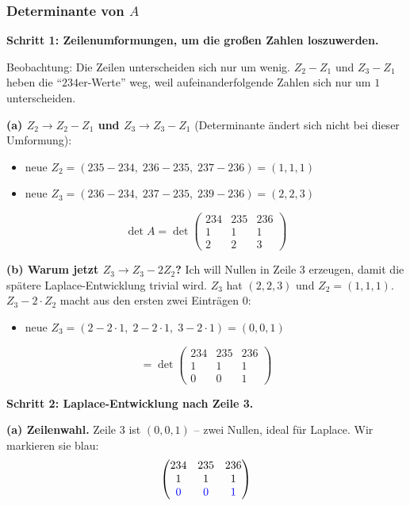 \documentclass[a4paper,12pt]{article}
\begin{document}
\subsubsection*{Determinante von $A$}

\textbf{Schritt 1: Zeilenumformungen, um die gro\ss en Zahlen loszuwerden.}

Beobachtung: Die Zeilen unterscheiden sich nur um wenig. $Z_2 - Z_1$ und $Z_3 - Z_1$ heben die ``$234$er-Werte'' weg, weil aufeinanderfolgende Zahlen sich nur um $1$ unterscheiden.

\textbf{(a) $Z_2 \to Z_2 - Z_1$ und $Z_3 \to Z_3 - Z_1$} (Determinante \"andert sich nicht bei dieser Umformung):
\begin{itemize}[leftmargin=*, nosep]
    \item neue $Z_2 = (235-234,\; 236-235,\; 237-236) = (1, 1, 1)$
    \item neue $Z_3 = (236-234,\; 237-235,\; 239-236) = (2, 2, 3)$
\end{itemize}
\[
\det A = \det \begin{pmatrix} 234 & 235 & 236 \\ 1 & 1 & 1 \\ 2 & 2 & 3 \end{pmatrix}
\]

\textbf{(b) Warum jetzt $Z_3 \to Z_3 - 2Z_2$?} Ich will Nullen in Zeile 3 erzeugen, damit die sp\"atere Laplace-Entwicklung trivial wird. $Z_3$ hat $(2, 2, 3)$ und $Z_2 = (1, 1, 1)$. $Z_3 - 2 \cdot Z_2$ macht aus den ersten zwei Eintr\"agen $0$:
\begin{itemize}[leftmargin=*, nosep]
    \item neue $Z_3 = (2 - 2 \cdot 1,\; 2 - 2 \cdot 1,\; 3 - 2 \cdot 1) = (0, 0, 1)$
\end{itemize}
\[
= \det \begin{pmatrix} 234 & 235 & 236 \\ 1 & 1 & 1 \\ 0 & 0 & 1 \end{pmatrix}
\]

\textbf{Schritt 2: Laplace-Entwicklung nach Zeile 3.}

\textbf{(a) Zeilenwahl.} Zeile 3 ist $(0, 0, 1)$ -- zwei Nullen, ideal f\"ur Laplace. Wir markieren sie blau:
\[
\begin{pmatrix}
234 & 235 & 236 \\
1 & 1 & 1 \\
\color{blue}0 & \color{blue}0 & \color{blue}1
\end{pmatrix}
\]
\end{document}
